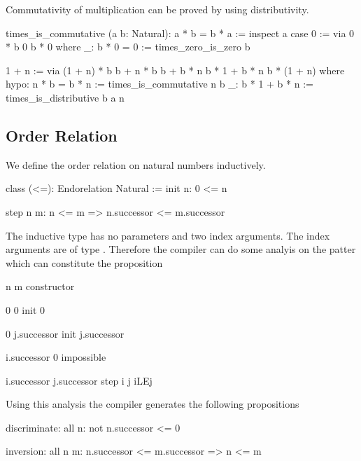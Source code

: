 Commutativity of multiplication can be proved by using distributivity.

\begin{alba}
  times_is_commutative (a b: Natural): a * b = b * a :=
    inspect a case
      0 :=
       via 0 * b
           0
           b * 0
       where
         _: b * 0 = 0 := times_zero_is_zero b

      1 + n :=
        via
          (1 + n) * b
          b + n * b
          b + b * n
          b * 1 + b * n
          b * (1 + n)
        where
          hypo: n * b = b * n := times_is_commutative n b
          _: b * 1 + b * n := times_is_distributive b a n
\end{alba}






\subsection{Order Relation}

We define the order relation on natural numbers inductively.

\begin{alba}
    class
        (<=): Endorelation Natural
    :=
        init n:
            0 <= n

        step n m:
            n <= m
            => n.successor <= m.successor
\end{alba}

The inductive type has no parameters and two index arguments. The index
arguments are of type . Therefore the compiler can do some analyis
on the patter which can constitute the proposition 

\begin{alba}
        n               m                   constructor

        0               0                   init 0

        0               j.successor         init j.successor

        i.successor     0                   impossible

        i.successor     j.successor         step i j iLEj
\end{alba}
%
Using this analysis the compiler generates the following propositions
\begin{alba}
    discriminate: all n: not n.successor <= 0

    inversion: all n m: n.successor <= m.successor => n <= m
\end{alba}



